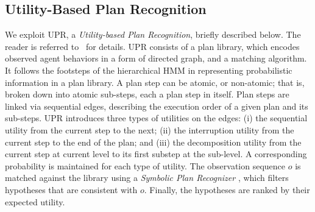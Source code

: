 \subsection{Utility-Based Plan Recognition}
\label{sec:UPR}
\noindent
We exploit UPR, a \textit{Utility-based Plan Recognition}, briefly described below. The reader is referred to~\cite{Avrahami-Zilberbrand2007} for details.
%
UPR consists of a plan library, which encodes observed agent behaviors in a form of directed graph, and a matching algorithm. It follows the footsteps
of the hierarchical HMM in representing probabilistic information in a plan library. 
A plan step can be atomic, or non-atomic; that is, broken down into atomic sub-steps, each a plan step in itself. 
Plan steps are linked via sequential edges, describing the execution order of a given plan and its sub-steps. 
%
UPR introduces three types of utilities on the edges: (i) the sequential utility from the current step to the next; (ii) the interruption utility from the current step to the end of the  plan; and (iii) the decomposition utility from the current step at current level to its first substep at the sub-level. A corresponding probability is maintained for each type of utility.
%
The observation sequence $o$ is matched against the library using a \textit{Symbolic Plan Recognizer} \citep{Avrahami-Zilberbrand2009}, which filters hypotheses that are consistent with $o$. Finally, the hypotheses are ranked by their expected utility.

